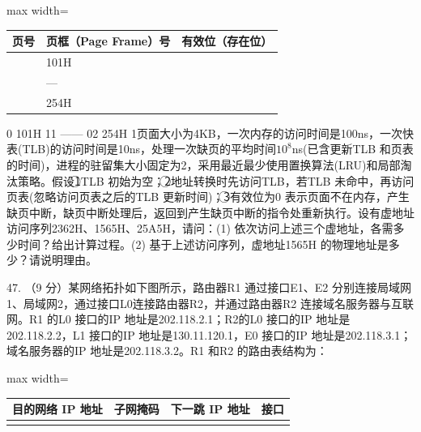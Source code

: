 \documentclass[UTF8,11pt]{ctexart}
\begin{document}
\begin{center}\begin{adjustbox}{max width=\linewidth}\begin{tabular}{|>{\raggedright\arraybackslash}p{\dimexpr(\linewidth-6\tabcolsep-4\arrayrulewidth)/3\relax}|>{\raggedright\arraybackslash}p{\dimexpr(\linewidth-6\tabcolsep-4\arrayrulewidth)/3\relax}|>{\raggedright\arraybackslash}p{\dimexpr(\linewidth-6\tabcolsep-4\arrayrulewidth)/3\relax}|}\hline
页号 & 页框（Page Frame）号 & 有效位（存在位）\\\hline
0 & 101H & 1\\\hline
1 & — & 0\\\hline
2 & 254H & 1\\\hline\end{tabular}\end{adjustbox}\end{center}

0 101H 11 —— 02 254H 1页面大小为4KB，一次内存的访问时间是100ns，一次快表(TLB)的访问时间是10ns，处理一次缺页的平均时间\(\displaystyle 10^8\)ns(已含更新TLB 和页表的时间)，进程的驻留集大小固定为2，采用最近最少使用置换算法(LRU)和局部淘汰策略。假设\textcircled{1}TLB 初始为空；\textcircled{2}地址转换时先访问TLB，若TLB 未命中，再访问页表(忽略访问页表之后的TLB 更新时间)；\textcircled{3}有效位为0 表示页面不在内存，产生缺页中断，缺页中断处理后，返回到产生缺页中断的指令处重新执行。设有虚地址访问序列2362H、1565H、25A5H，请问：(1) 依次访问上述三个虚地址，各需多少时间？给出计算过程。(2) 基于上述访问序列，虚地址1565H 的物理地址是多少？请说明理由。


47. （9 分）某网络拓扑如下图所示，路由器R1 通过接口E1、E2 分别连接局域网1、局域网2，通过接口L0连接路由器R2，并通过路由器R2 连接域名服务器与互联网。R1 的L0 接口的IP 地址是202.118.2.1；R2的L0 接口的IP 地址是202.118.2.2，L1 接口的IP 地址是130.11.120.1，E0 接口的IP 地址是202.118.3.1；域名服务器的IP 地址是202.118.3.2。R1 和R2 的路由表结构为：


\begin{center}\begin{adjustbox}{max width=\linewidth}\begin{tabular}{|>{\raggedright\arraybackslash}p{\dimexpr(\linewidth-8\tabcolsep-5\arrayrulewidth)/4\relax}|>{\raggedright\arraybackslash}p{\dimexpr(\linewidth-8\tabcolsep-5\arrayrulewidth)/4\relax}|>{\raggedright\arraybackslash}p{\dimexpr(\linewidth-8\tabcolsep-5\arrayrulewidth)/4\relax}|>{\raggedright\arraybackslash}p{\dimexpr(\linewidth-8\tabcolsep-5\arrayrulewidth)/4\relax}|}\hline
目的网络 IP 地址 & 子网掩码 & 下一跳 IP 地址 & 接口\\\hline
 &  &  & \\\hline\end{tabular}\end{adjustbox}\end{center}
\end{document}
